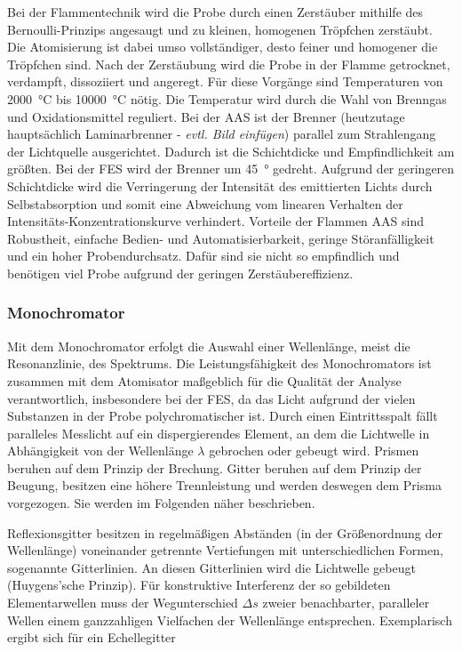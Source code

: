       Bei der Flammentechnik wird die Probe durch einen Zerstäuber mithilfe des Bernoulli-Prinzips angesaugt und zu kleinen, homogenen Tröpfchen zerstäubt. Die Atomisierung ist dabei umso vollständiger, desto feiner und homogener die Tröpfchen sind. Nach der Zerstäubung wird die Probe in der Flamme getrocknet, verdampft, dissoziiert und angeregt. Für diese Vorgänge sind Temperaturen von \SI[mode=text]{2000}{\degreeCelsius} bis \SI[mode=text]{10000}{\degreeCelsius} nötig. Die Temperatur wird durch die Wahl von Brenngas und Oxidationsmittel reguliert. Bei der AAS ist der Brenner (heutzutage hauptsächlich Laminarbrenner - \textit{evtl. Bild einfügen}) parallel zum Strahlengang der Lichtquelle ausgerichtet. Dadurch ist die Schichtdicke und Empfindlichkeit am größten. Bei der FES wird der Brenner um \SI[mode=text]{45}{\degree} gedreht. Aufgrund der geringeren Schichtdicke wird die Verringerung der Intensität des emittierten Lichts durch Selbstabsorption und somit eine Abweichung vom linearen Verhalten der Intensitäts-Konzentrationskurve verhindert. Vorteile der Flammen AAS sind Robustheit, einfache Bedien- und Automatisierbarkeit, geringe Störanfälligkeit und ein hoher Probendurchsatz.  Dafür sind sie nicht so empfindlich und benötigen viel Probe aufgrund der geringen Zerstäubereffizienz. \citep{AnalytikIII}
        
    \subsubsection{Monochromator}
      
      Mit dem Monochromator erfolgt die Auswahl einer Wellenlänge, meist die Resonanzlinie, des Spektrums. Die Leistungsfähigkeit des Monochromators ist zusammen mit dem Atomisator maßgeblich für die Qualität der Analyse verantwortlich, insbesondere bei der FES, da das Licht aufgrund der vielen Substanzen in der Probe polychromatischer ist. Durch einen Eintrittsspalt fällt paralleles Messlicht auf ein dispergierendes Element, an dem die Lichtwelle in Abhängigkeit von der Wellenlänge $\lambda$ gebrochen oder gebeugt wird. Prismen beruhen auf dem Prinzip der Brechung. Gitter beruhen auf dem Prinzip der Beugung, besitzen eine höhere Trennleistung und werden deswegen dem Prisma vorgezogen. Sie werden im Folgenden näher beschrieben.
      
      Reflexionsgitter besitzen in regelmäßigen Abständen (in der Größenordnung der Wellenlänge) voneinander getrennte Vertiefungen mit unterschiedlichen Formen, sogenannte Gitterlinien. An diesen Gitterlinien wird die Lichtwelle gebeugt (Huygens'sche Prinzip). Für konstruktive Interferenz der so gebildeten Elementarwellen muss der Wegunterschied $\Delta s$ zweier benachbarter, paralleler Wellen einem ganzzahligen Vielfachen der Wellenlänge entsprechen. Exemplarisch ergibt sich für ein Echellegitter
      
